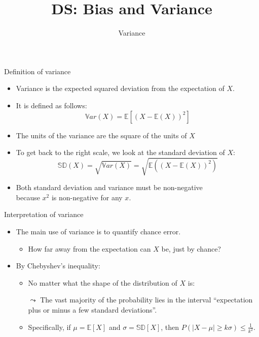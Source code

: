 \documentclass[aspectratio=169]{../latex_main/tntbeamer}  %
\title[Statistics]{DS: Bias and Variance}
\subtitle{Variance}
\begin{document}
	
	\maketitle
	\begin{frame}{Definition of variance}
	    \begin{itemize}
	        \item \alert{Variance} is the expected squared deviation from the expectation of $X$.
	        \item It is defined as follows:
	        \begin{equation*}
	            \mathbb{V}ar(X) = \mathbb{E}\left[(X - \mathbb{E}(X))^2\right]
	        \end{equation*}
	        \item The units of the variance are the square of the units of $X$
	        \item To get back to the right scale, we look at the \alert{standard deviation} of $X$:
	        \begin{equation*}
	            \mathbb{SD}(X)  = \sqrt{\mathbb{V}ar(X)}  =\sqrt{\mathbb{E}((X - \mathbb{E}(X))^2)}
	        \end{equation*}
	        \item Both standard deviation and variance must be non-negative\\ because $x^2$ is non-negative for any $x$.
	    \end{itemize}
	\end{frame}
	
	
	\begin{frame}[c]{Interpretation of variance}
	    \begin{itemize}
	        \item The main use of variance is to quantify chance error.
	        \begin{itemize}
	            \item How far away from the expectation can $X$ be, just by chance?
	        \end{itemize}
	        \item By Chebyshev’s inequality:
	        \begin{itemize}
	            \item No matter what the shape of the distribution of $X$ is:
	            \item[$\leadsto$] The vast majority of the probability lies in the interval “expectation plus or minus a few standard deviations”.
	            \item Specifically, if   $\mu  = \mathbb{E}[X]$ and    $\sigma   = \mathbb{SD}[X]$, then $P(|X - \mu| \geq k\sigma) \leq \frac{1}{k^2}$.   
	        \end{itemize}
	    \end{itemize}
	\end{frame}
	
\end{document}
